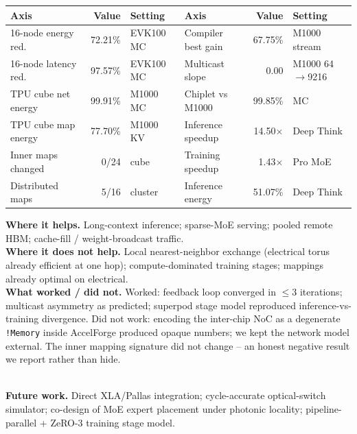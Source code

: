\documentclass[a0paper,portrait]{tikzposter}
\begin{document}
{\begin{minipage}[t]{0.42\linewidth}
\smaller
\begin{tabular}{l r l | l r l}
\toprule
Axis & Value & Setting & Axis & Value & Setting \\
\midrule
16-node energy red.   & 72.21\%        & EVK100 MC          & Compiler best gain    & 67.75\%        & M1000 stream \\
16-node latency red.  & 97.57\%        & EVK100 MC          & Multicast slope       & 0.00           & M1000 64$\to$9216 \\
TPU cube net energy   & 99.91\%        & M1000 MC           & Chiplet vs M1000      & 99.85\%        & MC \\
TPU cube map energy   & 77.70\%        & M1000 KV           & Inference speedup     & 14.50$\times$  & Deep Think \\
Inner maps changed    & 0/24           & cube               & Training speedup      & 1.43$\times$   & Pro MoE \\
Distributed maps      & 5/16           & cluster            & Inference energy      & 51.07\%        & Deep Think \\
\bottomrule
\end{tabular}
\end{minipage}\hfill
\begin{minipage}[t]{0.56\linewidth}
\vspace{-5em}
\textbf{Where it helps.} Long-context inference; sparse-MoE serving;
pooled remote HBM; cache-fill / weight-broadcast traffic.\\[0.4em]
\textbf{Where it does not help.} Local nearest-neighbor exchange
(electrical torus already efficient at one hop); compute-dominated
training stages; mappings already optimal on electrical.\\[0.4em]
\textbf{What worked / did not.} Worked: feedback loop converged in
$\le 3$ iterations; multicast asymmetry as predicted; superpod stage
model reproduced inference-vs-training divergence. Did not work:
encoding the inter-chip NoC as a degenerate \texttt{!Memory} inside
AccelForge produced opaque numbers; we kept the network model
external. The inner mapping signature did not change -- an honest
negative result we report rather than hide.
\end{minipage}
\\[0.4em]
\textbf{Future work.} Direct XLA/Pallas integration; cycle-accurate
optical-switch simulator; co-design of MoE expert placement under
photonic locality; pipeline-parallel + ZeRO-3 training stage model.
}
\end{document}

